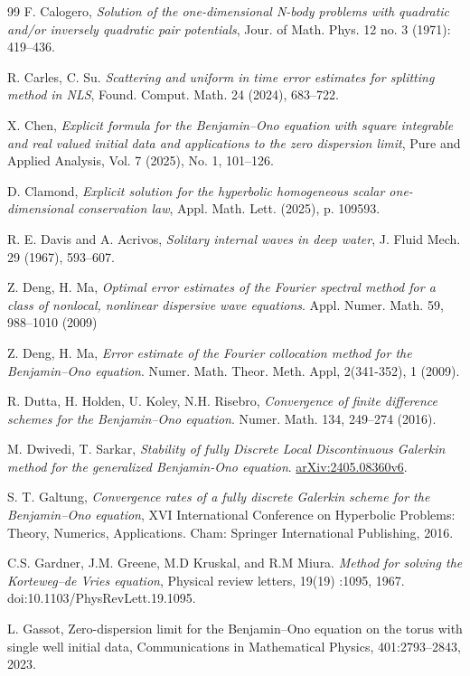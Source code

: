 \documentclass [11pt] {article}
\begin{document}
\begin{thebibliography}{99}
 F. Calogero, {\it Solution of the one-dimensional N-body problems with quadratic and/or inversely quadratic pair potentials}, Jour. of Math. Phys. 12 no. 3 (1971): 419--436.

 R. Carles, C. Su. {\it Scattering and uniform in time error estimates for splitting method in NLS}, Found. Comput. Math. 24 (2024), 683--722.

 X. Chen, {\it Explicit formula for the Benjamin--Ono equation with square integrable and real valued initial data and applications to the zero dispersion limit},  Pure and Applied Analysis, Vol. 7 (2025), No. 1, 101–126.

 D. Clamond, {\it Explicit solution for the hyperbolic homogeneous scalar one-dimensional conservation law}, Appl. Math. Lett. (2025), p. 109593.

 R. E. Davis and A. Acrivos, {\it Solitary internal waves in deep water}, J. Fluid Mech. 29 (1967), 593–607.

 Z. Deng, H. Ma, {\it Optimal error estimates of the Fourier spectral method for a class of nonlocal, nonlinear dispersive wave equations}. Appl. Numer. Math. 59, 988--1010 (2009)

 Z. Deng, H. Ma, {\it Error estimate of the Fourier collocation method for the Benjamin–Ono equation}. Numer. Math. Theor. Meth. Appl, 2(341-352), 1  (2009). 

 R. Dutta, H. Holden, U. Koley, N.H. Risebro, {\it Convergence of finite difference schemes for the Benjamin--Ono equation}. Numer. Math. 134, 249--274 (2016).

 M. Dwivedi, T. Sarkar, {\it Stability of fully Discrete Local Discontinuous Galerkin method for the generalized Benjamin-Ono equation}. \href{https://arxiv.org/abs/2405.08360v6}{arXiv:2405.08360v6}.

 S. T. Galtung, {\it Convergence rates of a fully discrete Galerkin scheme for the Benjamin--Ono equation}, XVI International Conference on Hyperbolic Problems: Theory, Numerics, Applications. Cham: Springer International Publishing, 2016.

 C.S. Gardner, J.M. Greene, M.D Kruskal, and R.M Miura. {\it Method for solving the Korteweg--de Vries equation}, Physical review letters, 19(19) :1095, 1967. doi:10.1103/PhysRevLett.19.1095.

 L. Gassot, Zero-dispersion limit for the Benjamin–Ono equation on the torus with single well initial data, Communications in Mathematical Physics, 401:2793--2843, 2023.


\end{thebibliography}
\end{document}
